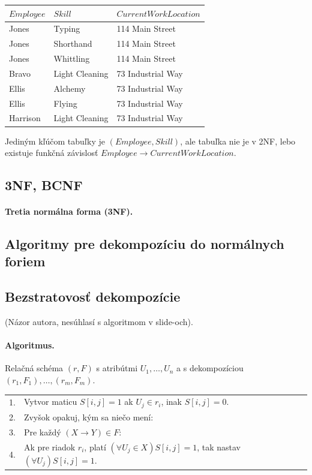 \documentclass[10pt,a4paper]{article}
\begin{document}
\begin{center}
\begin{tabular}{l|l|l}
$Employee$ & $Skill$ & $Current Work Location$ \\
\hline
Jones &	Typing &	114 Main Street \\
Jones &	Shorthand &	114 Main Street \\
Jones &	Whittling &	114 Main Street \\
Bravo &	Light Cleaning &	73 Industrial Way \\
Ellis &	Alchemy &	73 Industrial Way \\
Ellis &	Flying &	73 Industrial Way \\
Harrison &	Light Cleaning &	73 Industrial Way \\
\end{tabular}
\end{center}

Jediným kľúčom tabuľky je $(Employee, Skill)$, ale tabuľka nie je v 2NF, lebo existuje funkčná závislosť $Employee \rightarrow Current Work Location$.

\subsection{3NF, BCNF}

\paragraph{Tretia normálna forma (3NF).} 

\subsection{Algoritmy pre dekompozíciu do normálnych foriem}
\subsection{Bezstratovosť dekompozície}
(Názor autora, nesúhlasí s algoritmom v slide-och). 

\paragraph{Algoritmus.}
Relačná schéma $(r,F)$ s atribútmi $U_1,\ldots,U_n$ a s dekompozíciou $(r_1, F_1),\ldots,(r_m, F_m)$.

\begin{tabular}{ll}
1. & Vytvor maticu $S[i,j] = 1$ ak $U_j \in r_i$, inak $S[i,j] = 0$.\\
2. & Zvyšok opakuj, kým sa niečo mení:\\
3. & Pre každý $(X \rightarrow Y) \in F$:\\
4. & Ak pre riadok $r_i$, platí $(\forall U_j \in X)S[i,j]=1$, tak nastav $(\forall U_j)S[i,j]=1$.\\
\end{tabular}
\end{document}
